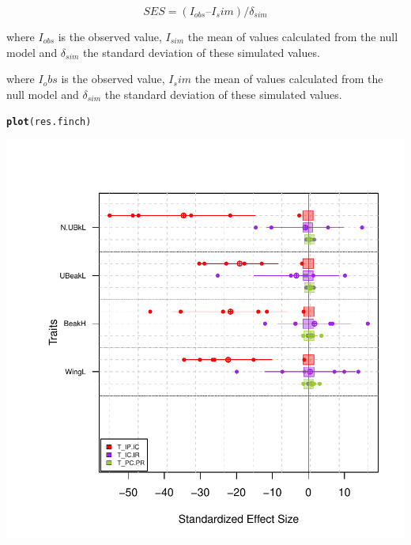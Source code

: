 \documentclass[12pt]{article}\usepackage[]{graphicx}\usepackage[]{color}
\makeatletter
\def\maxwidth{ %
  \ifdim\Gin@nat@width>\linewidth
    \linewidth
  \else
    \Gin@nat@width
  \fi
}
\newcommand{\hlstd}[1]{\textcolor[rgb]{0.345,0.345,0.345}{#1}}%
\newcommand{\hlkwd}[1]{\textcolor[rgb]{0.737,0.353,0.396}{\textbf{#1}}}%
\newenvironment{kframe}{%
 \def\at@end@of@kframe{}%
 \ifinner\ifhmode%
  \def\at@end@of@kframe{\end{minipage}}%
  \begin{minipage}{\columnwidth}%
 \fi\fi%
 \def\FrameCommand##1{\hskip\@totalleftmargin \hskip-\fboxsep
 \colorbox{shadecolor}{##1}\hskip-\fboxsep
     \hskip-\linewidth \hskip-\@totalleftmargin \hskip\columnwidth}%
 \MakeFramed {\advance\hsize-\width
   \@totalleftmargin\z@ \linewidth\hsize
   \@setminipage}}%
 {\par\unskip\endMakeFramed%
 \at@end@of@kframe}
\newenvironment{knitrout}{}{} %
\makeatother
\begin{document}
\begin{center}
$$ SES = (I_{obs}  I{_sim}) / \delta_{sim} $$
\end{center}


where $I_{obs}$ is the observed value, $I_{sim}$ the mean of values calculated from the null model and $\delta_{sim}$ the standard deviation of these simulated values.


where $I_obs$ is the observed value, $I_sim$ the mean of values calculated from the null model and $\delta_{sim}$ the standard deviation of these simulated values.


\begin{knitrout}
\color{fgcolor}\begin{kframe}
\begin{alltt}
\hlkwd{plot}\hlstd{(res.finch)}
\end{alltt}
\end{kframe}

{\centering \includegraphics[width=\maxwidth]{figure/unnamed-chunk-34} 

}



\end{knitrout}
\end{document}
